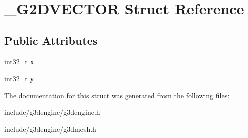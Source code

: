 \hypertarget{struct__G2DVECTOR}{}\section{\+\_\+\+G2\+D\+V\+E\+C\+T\+OR Struct Reference}
\label{struct__G2DVECTOR}
\subsection*{Public Attributes}
\begin{DoxyCompactItemize}
\item 
\mbox{\label{struct__G2DVECTOR_aa8720c44d880d55e34e3e06744e4c246}} 
int32\+\_\+t {\bfseries x}
\item 
\mbox{\label{struct__G2DVECTOR_a027080e7aaf3a43718d5461343a1fdb5}} 
int32\+\_\+t {\bfseries y}
\end{DoxyCompactItemize}


The documentation for this struct was generated from the following files\+:\begin{DoxyCompactItemize}
\item 
include/g3dengine/g3dengine.\+h\item 
include/g3dengine/g3dmesh.\+h\end{DoxyCompactItemize}
